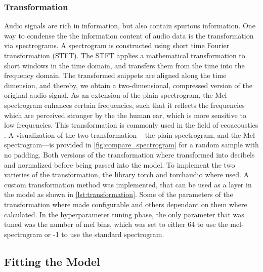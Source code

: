\subsubsection{Transformation}%
Audio signals are rich in information, but also contain spurious information.
One way to condense the the information content of audio data is the transformation via spectrograms.
A spectrogram is constructed using short time Fourier transformation (STFT).
The STFT applies a mathematical transformation to short windows in the time domain, and transfers them from the time into the frequency domain.
The transformed snippets are aligned along the time dimension, and thereby, we obtain a two-dimensional, compressed version of the original audio signal.
As an extension of the plain spectrogram, the Mel spectrogram enhances certain frequencies, 
such that it reflects the frequencies which are perceived stronger by the the human ear, which is more sensitive to low frequencies.
This transformation is commonly used in the field of ecoacoustics \autocite[7]{stowellComputationalBioacousticsDeep2022}.
A visualization of the two transformation -- the plain spectrogram, and the Mel spectrogram---is provided in \autoref{fig:compare_spectrogram}
for a random sample with no padding. Both versions of the transformation where transformed into decibels and normalized before 
being passed into the model.
To implement the two varieties of the transformation, the library torch and torchaudio where used.
A custom transformation method was implemented, that can be used as a layer in the model as shown in 
\autoref{lst:transformation}. Some of the parameters of the transformation where made configurable
and others dependant on them where calculated. In the hyperparameter tuning phase, the only parameter
that was tuned was the number of mel bins, which was set to either 64 to use the mel-spectrogram or -1
to use the standard spectrogram.





\subsection{Fitting the Model}%

